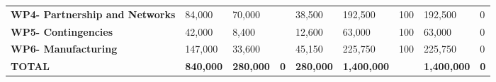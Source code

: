 \begin{table}[H]
{\begin{tabular}{p{5cm}p{2cm}p{2cm}p{2.5cm}p{2cm}p{2cm}p{2cm}p{2cm}p{2cm}}
\textbf{WP4- Partnership and Networks} & 84,000                                                                 & 70,000                                                             &                                                                                 & 38,500                                                                       & 192,500                                                                                       & 100                          & 192,500                         & 0                                                                         \\
\textbf{WP5- Contingencies}                                                        & 42,000                                                                 & 8,400                                                              &                                                                                 & 12,600                                                                       & 63,000                                                                                        & 100                          & 63,000                          & 0                                                                         \\
\textbf{WP6- Manufacturing}                                                        & 147,000                                                                & 33,600                                                             &                                                                                 & 45,150                                                                       & 225,750                                                                                       & 100                          & 225,750                         & 0                                                                         \\ \hline
\textbf{TOTAL}                                                                     & \textbf{840,000}                                                       & \textbf{280,000}                                                   & \textbf{0}                                                                      & \textbf{280,000}                                                             & \textbf{1,400,000}                                                                            & \textbf{}                    & \textbf{1,400,000}              & \textbf{0}                                                               
 \\ \bottomrule[2pt]
\end{tabular} }
\end{table}


